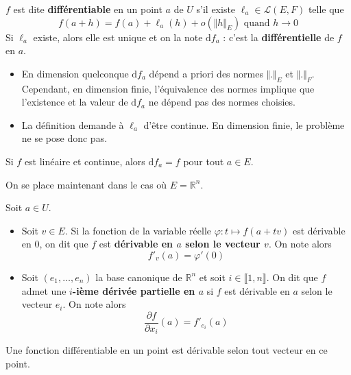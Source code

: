 	\begin{definition}
		$f$ est dite \textbf{différentiable} en un point $a$ de $U$ s'il existe $\ell_a \in \mathcal{L}(E,F)$ telle que
		\[ f(a+h) = f(a) + \ell_a(h) + o(\Vert h \Vert_E) \text{ quand } h \longrightarrow 0 \]
		Si $\ell_a$ existe, alors elle est unique et on la note $\mathrm{d}f_a$ : c'est la \textbf{différentielle} de $f$ en $a$.
	\end{definition}

	\begin{remark}
		\begin{itemize}
			\item En dimension quelconque $\mathrm{d}f_a$ dépend a priori des normes $\Vert . \Vert_E$ et $\Vert . \Vert_F$. Cependant, en dimension finie, l'équivalence des normes implique que l'existence et la valeur de $\mathrm{d}f_a$ ne dépend pas des normes choisies.
			\item La définition demande à $\ell_a$ d'être continue. En dimension finie, le problème ne se pose donc pas.
		\end{itemize}
	\end{remark}

	\begin{example}
		Si $f$ est linéaire et continue, alors $\mathrm{d}f_a = f$ pour tout $a \in E$.
	\end{example}

	On se place maintenant dans le cas où $E = \mathbb{R}^n$.

	\begin{definition}
		Soit $a \in U$.
		\begin{itemize}
			\item Soit $v \in E$. Si la fonction de la variable réelle $\varphi : t \mapsto f(a+tv)$ est dérivable en $0$, on dit que $f$ est \textbf{dérivable en $a$ selon le vecteur $v$}. On note alors
			\[ f'_v(a) = \varphi'(0) \]
			\item Soit $(e_1, \dots, e_n)$ la base canonique de $\mathbb{R}^n$ et soit $i \in \llbracket 1, n \rrbracket$. On dit que $f$ admet une \textbf{$i$-ième dérivée partielle en $a$} si $f$ est dérivable en $a$ selon le vecteur $e_i$. On note alors
			\[ \frac{\partial f}{\partial x_i}(a) = f'_{e_i}(a) \]
		\end{itemize}
	\end{definition}

	\begin{proposition}
		Une fonction différentiable en un point est dérivable selon tout vecteur en ce point.
	\end{proposition}

